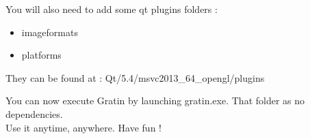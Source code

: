 \documentclass{beamer}
\begin{document}
\begin{frame}
  You will also need to add some qt plugins folders :
  \begin{itemize}
    \item imageformats
    \item platforms
  \end{itemize}
  They can be found at : Qt/5.4/msvc2013\_64\_opengl/plugins
\end{frame}

\begin{frame}
  You can now execute Gratin by launching gratin.exe. That folder as no dependencies.\\Use it anytime, anywhere. Have fun !
\end{frame}
\end{document}
